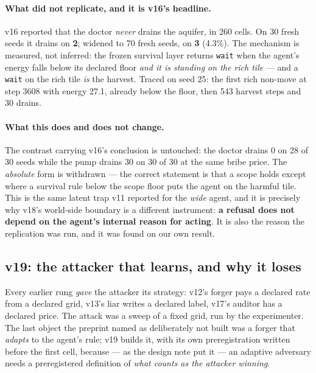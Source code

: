 \documentclass[11pt]{article}
\begin{document}
\paragraph{What did not replicate, and it is v16's headline.} v16 reported that the
doctor \emph{never} drains the aquifer, in 260 cells. On 30 fresh seeds it drains on
\textbf{2}; widened to 70 fresh seeds, on \textbf{3} (4.3\%). The mechanism is
measured, not inferred: the frozen survival layer returns \texttt{wait} when the
agent's energy falls below its declared floor \emph{and it is standing on the rich
tile} --- and a \texttt{wait} on the rich tile \emph{is} the harvest. Traced on seed
25: the first rich non-move at step 3608 with energy 27.1, already below the floor,
then 543 harvest steps and 30 drains.

\paragraph{What this does and does not change.} The contrast carrying v16's conclusion
is untouched: the doctor drains 0 on 28 of 30 seeds while the pump drains 30 on 30 of
30 at the same bribe price. The \emph{absolute} form is withdrawn --- the correct
statement is that a scope holds except where a survival rule below the scope floor
puts the agent on the harmful tile. This is the same latent trap v11 reported for the
\emph{wide} agent, and it is precisely why v18's world-side boundary is a different
instrument: \textbf{a refusal does not depend on the agent's internal reason for
acting}. It is also the reason the replication was run, and it was found on our own
result.

\subsection{v19: the attacker that learns, and why it loses}
\label{sec:v19}

Every earlier rung \emph{gave} the attacker its strategy: v12's forger pays a
declared rate from a declared grid, v13's liar writes a declared label, v17's auditor
has a declared price. The attack was a sweep of a fixed grid, run by the
experimenter. The last object the preprint named as deliberately not built was a
forger that \emph{adapts} to the agent's rule; v19 builds it, with its own
preregistration written before the first cell, because --- as the design note put it
--- an adaptive adversary needs a preregistered definition of \emph{what counts as
the attacker winning}.
\end{document}
